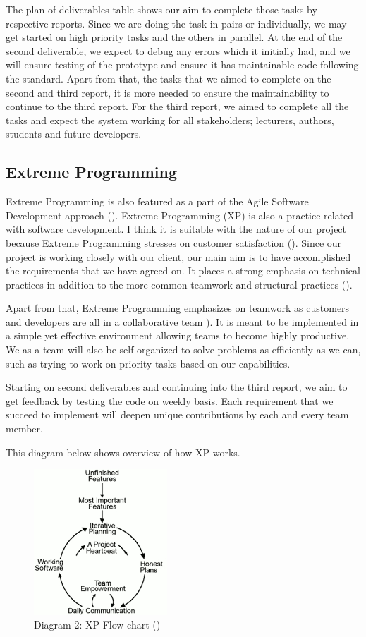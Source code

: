 		The plan of deliverables table shows our aim to complete those tasks by respective reports. Since we are doing the task in pairs or individually, we may get started on high priority tasks and the others in parallel. At the end of the second deliverable, we expect to debug any errors which it initially had, and we will ensure testing of the prototype and ensure it has maintainable code following the standard. Apart from that, the tasks that we aimed to complete on the second and third report, it is more needed to ensure the maintainability to continue to the third report. For the third report, we aimed to complete all the tasks and expect the system working for all stakeholders; lecturers, authors, students and future developers. 
	
	
	\subsection*{Extreme Programming}
		Extreme Programming is also featured as a part of the Agile Software Development approach (\cite{agileModeling}). Extreme Programming (XP) is also a practice related with software development. I think it is suitable with the nature of our project because Extreme Programming stresses on customer satisfaction (\cite{agileXPFlowchart}). Since our project is working closely with our client, our main aim is to have accomplished the requirements that we have agreed on.  It places a strong emphasis on technical practices in addition to the more common teamwork and structural practices (\cite{agileArtOfDevelopment}).
			
		Apart from that, Extreme Programming emphasizes on teamwork as customers and developers are all in a collaborative team \cite{agileXPFlowchart}). It is meant to be implemented in a simple yet effective environment allowing teams to become highly productive. We as a team will also be self-organized to solve problems as efficiently as we can, such as trying to  work on priority tasks based on our capabilities.
		
		Starting on second deliverables and continuing into the third report, we aim to get feedback by testing the code on weekly basis. Each requirement that we succeed to implement will deepen unique contributions by each and every team member. 
		
		This diagram below shows overview of how XP works.  
		
		\begin{figure}[!htbp]
			\centerline{\includegraphics[width=5cm]{resources/agileflowchart.jpg}}
			\caption{Diagram 2: XP Flow chart (\cite{agileXPFlowchart})}
		\end{figure}
		
